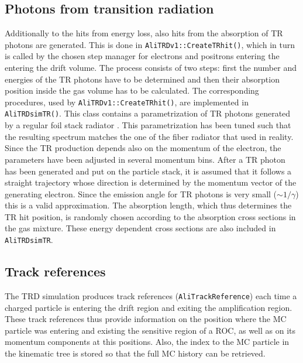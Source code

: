 \documentclass{alicetdr}
\begin{document}
\subsection{Photons from transition radiation}
%
Additionally to the hits from energy loss, also hits from the absorption of
TR photons are generated.  This is done in {\tt AliTRDv1::CreateTRhit()}, which
in turn is called by the chosen step manager for electrons and positrons
entering the entering the drift volume.  The process consists of two steps:
first the number and energies of the TR photons have to be determined and then
their absorption position inside the gas volume has to be calculated.  The
corresponding procedures, used by {\tt AliTRDv1::CreateTRhit()}, are
implemented in {\tt AliTRDsimTR()}.  This class contains a parametrization
of TR photons generated by a regular foil stack radiator \cite{TRPHOT}.  This
parametrization has been tuned such that the resulting spectrum matches the
one of the fiber radiator that used in reality.  Since the TR production
depends also on the momentum of the electron, the parameters have been
adjusted in several momentum bins.  After a TR photon has been generated and put
on the particle stack, it is assumed that it follows a straight trajectory
whose direction is determined by the momentum vector of the generating electron.
Since the emission angle for TR photons is very small ($\sim 1/\gamma$) this
is a valid approximation.  The absorption length, which thus determines the
TR hit position, is randomly chosen according to the absorption cross sections
in the gas mixture.  These energy dependent cross sections are also included
in {\tt AliTRDsimTR}.
%
\subsection{Track references}
%
The TRD simulation produces track references ({\tt AliTrackReference}) each time
a charged particle is entering the drift region and exiting the amplification
region.  These track references thus provide information on the position where
the MC particle was entering and existing the sensitive region of a ROC, as well
as on its momentum components at this positions.  Also, the index to the MC particle
in the kinematic tree is stored so that the full MC history can be retrieved.
%
\end{document}
